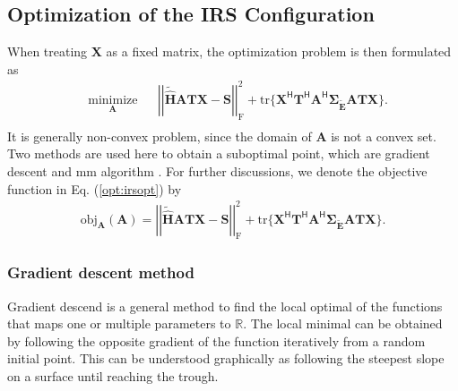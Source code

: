 \documentclass[12pt,draftclsnofoot,onecolumn,journal]{IEEEtran}
\begin{document}
\subsection{Optimization of the IRS Configuration}
When treating $\mathbf X$ as a fixed matrix, the optimization problem is then formulated as
\begin{equation}
\begin{aligned}
& \underset{\mathbf A}{\text{minimize}}
& &\left|\left|\tilde{\hat{\mathbf H}}\mathbf{ATX}-\mathbf{S}\right|\right|_{\mathrm{F}}^2+\mathrm{tr}\{\mathbf X^{\mathsf H}\mathbf T^{\mathsf H}\mathbf A^{\mathsf H}
\pmb{\Sigma_{\tilde{\mathbf E}}}\mathbf{ATX}\}.\\
\label{opt:irsopt}
\end{aligned}
\end{equation}
It is generally non-convex problem, since the domain of $\mathbf A$ is not a convex set. Two methods are used here to obtain a suboptimal point, which are gradient descent and \ac{mm} algorithm \cite{sankuru2020designing}. For further discussions, we denote the objective function in Eq. (\ref{opt:irsopt}) by
\begin{equation}
\begin{split}
\mathrm{obj}_{\mathbf A}(\mathbf A)=\left|\left|\tilde{\hat{\mathbf H}}\mathbf{ATX}-\mathbf{S}\right|\right|_{\mathrm{F}}^2+\mathrm{tr}\{\mathbf X^{\mathsf H}\mathbf T^{\mathsf H}\mathbf A^{\mathsf H}
\pmb{\Sigma_{\tilde{\mathbf E}}}\mathbf{ATX}\}.
\label{eq:objectivefunctionofirs}
\end{split}
\end{equation}

\subsubsection{Gradient descent method}
Gradient descend is a general method to find the local optimal of the functions that maps one or multiple parameters to $\mathbb R$. The local minimal can be obtained by following the opposite gradient of the function iteratively from a random initial point. This can be understood graphically as following the steepest slope on a surface until reaching the trough.
\end{document}
